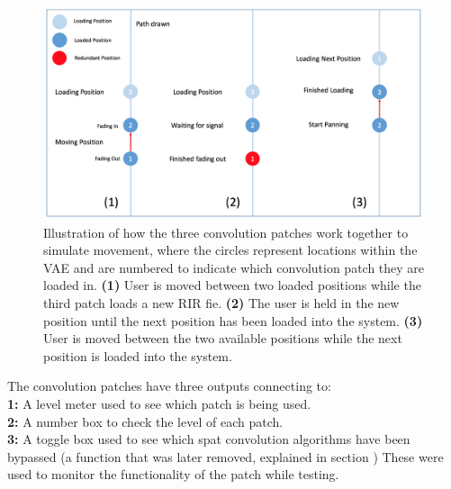 \documentclass[../../main.tex]{subfiles}
\begin{document}
			\begin{figure}[H]
				\centerline{\includegraphics[scale = 0.45]{Sections/Implementation/Max/images/Max/Iteration3/movementIllustration2.png}}
				\caption{Illustration of how the three convolution patches work together to simulate movement, where the circles represent locations within the \ac{VAE} and are numbered to indicate which convolution patch they are loaded in. \textbf{(1)} User is moved between two loaded positions while the third patch loads a new \ac{RIR} fie. \textbf{(2)} The user is held in the new position until the next position has been loaded into the system. \textbf{(3)} User is moved between the two available positions while the next position is loaded into the system.}
				\label{movementIllustration}
			\end{figure}

			The convolution patches have three outputs connecting to:\\
			\textbf{1:} A level meter used to see which patch is being used.\\
			\textbf{2:} A number box to check the level of each patch. \\
			\textbf{3:} A toggle box used to see which spat convolution algorithms have been bypassed (a function that was later removed, explained in section ) These were used to monitor the functionality of the patch while testing.
\end{document}

